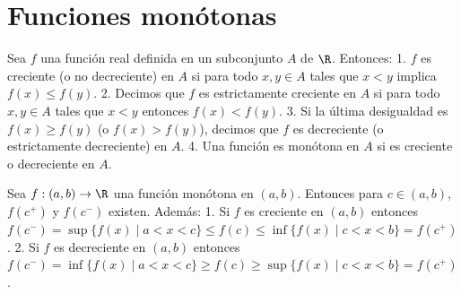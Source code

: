 \section*{Funciones monótonas} %

\begin{definicion} %
Sea $f$ una función real definida en un subconjunto $A$ de $\R$. Entonces: %
1. $f$ es creciente (o no decreciente) en $A$ si para todo $x, y \in A$ tales que $x < y$ implica $f(x) \le f(y)$. %
2. Decimos que $f$ es estrictamente creciente en $A$ si para todo $x, y \in A$ tales que $x < y$ entonces $f(x) < f(y)$. %
3. Si la última desigualdad es $f(x) \ge f(y)$ (o $f(x) > f(y)$), decimos que $f$ es decreciente (o estrictamente decreciente) en $A$. %
4. Una función es monótona en $A$ si es creciente o decreciente en $A$. %
\end{definicion}

\begin{teorema} %
Sea $f: (a,b) \to \R$ una función monótona en $(a,b)$. Entonces para $c \in (a,b)$, $f(c^+)$ y $f(c^-)$ existen. %
Además: %
1. Si $f$ es creciente en $(a,b)$ entonces $f(c^-) = \sup\{f(x) \mid a < x < c\} \le f(c) \le \inf\{f(x) \mid c < x < b\} = f(c^+)$. %
2. Si $f$ es decreciente en $(a,b)$ entonces $f(c^-) = \inf\{f(x) \mid a < x < c\} \ge f(c) \ge \sup\{f(x) \mid c < x < b\} = f(c^+)$. %
\end{teorema}

